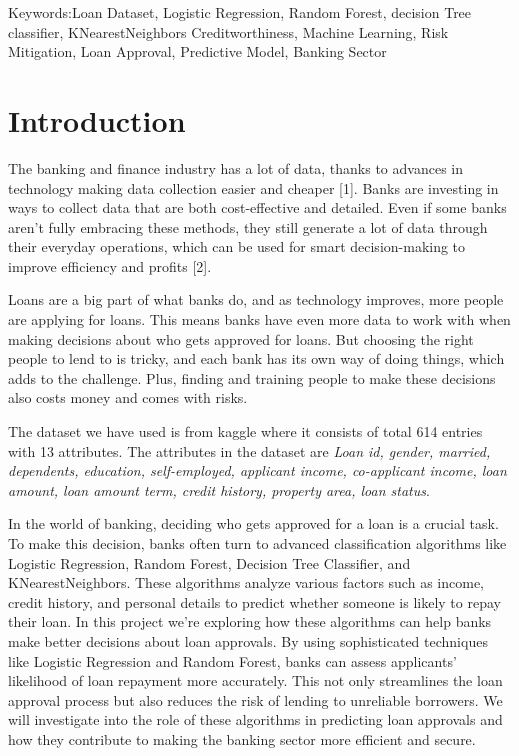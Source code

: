 \documentclass[conference]{IEEEtran}
\begin{document}
\begin{IEEEkeywords}
Keywords:Loan Dataset, Logistic Regression, Random Forest, decision Tree classifier, KNearestNeighbors  Creditworthiness, Machine Learning, Risk Mitigation, Loan Approval, Predictive Model, Banking Sector
\end{IEEEkeywords}
	\section{Introduction}
The banking and finance industry has a lot of data, thanks to advances in technology making data collection easier and cheaper [1]. Banks are investing in ways to collect data that are both cost-effective and detailed. Even if some banks aren't fully embracing these methods, they still generate a lot of data through their everyday operations, which can be used for smart decision-making to improve efficiency and profits [2].

Loans are a big part of what banks do, and as technology improves, more people are applying for loans. This means banks have even more data to work with when making decisions about who gets approved for loans. But choosing the right people to lend to is tricky, and each bank has its own way of doing things, which adds to the challenge. Plus, finding and training people to make these decisions also costs money and comes with risks.  

The dataset we have used is from kaggle where it consists of total 614 entries with 13 attributes. The attributes in the dataset are \textit{Loan id, gender, married, dependents, education, self-employed, applicant income, co-applicant income, loan amount, loan amount term, credit history, property area, loan status}.

In the world of banking, deciding who gets approved for a loan is a crucial task\cite{p3}. To make this decision, banks often turn to advanced classification algorithms like Logistic Regression, Random Forest, Decision Tree Classifier, and KNearestNeighbors. These algorithms analyze various factors such as income, credit history, and personal details to predict whether someone is likely to repay their loan. In this project we're exploring how these algorithms can help banks make better decisions about loan approvals. By using sophisticated techniques like Logistic Regression and Random Forest, banks can assess applicants' likelihood of loan repayment more accurately. This not only streamlines the loan approval process but also reduces the risk of lending to unreliable borrowers\cite{p4}. We will investigate into the role of these algorithms in predicting loan approvals and how they contribute to making the banking sector more efficient and secure.
\end{document}
